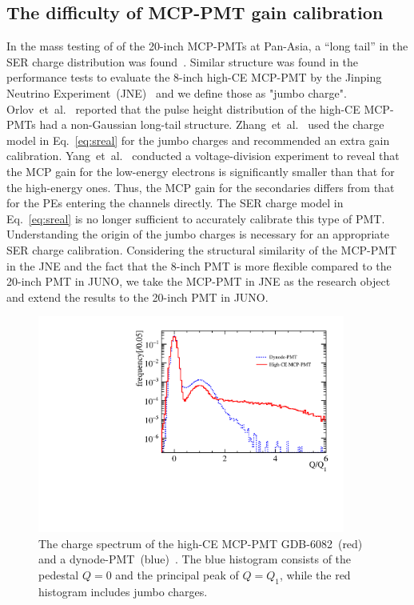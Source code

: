 \subsection{The difficulty of MCP-PMT gain calibration}
In the mass testing of of the 20-inch MCP-PMTs at Pan-Asia, a ``long tail'' in the SER charge distribution was found~\cite{JUNO:2022hlz}. Similar structure was found in the performance tests to evaluate the 8-inch high-CE MCP-PMT by the Jinping Neutrino Experiment~(JNE)~\cite{Zhang:2023ued} and we define those as "jumbo charge".
Orlov~et~al.~\cite{reviewer1} reported that the pulse height distribution of the high-CE MCP-PMTs had a non-Gaussian long-tail structure. Zhang~et~al.~\cite{2021Gain} used the charge model in Eq.~\eqref{eq:sreal} for the jumbo charges and recommended an extra gain calibration. Yang~et~al.~\cite{2017MCP} conducted a voltage-division experiment to reveal that the MCP gain for the low-energy electrons is significantly smaller than that for the high-energy ones.
Thus, the MCP gain for the secondaries differs from that for the PEs entering the channels directly.
The SER charge model in Eq.~\eqref{eq:sreal} is no longer sufficient to accurately calibrate this type of PMT.
Understanding the origin of the jumbo charges is necessary for an appropriate SER charge calibration.
Considering the structural similarity of the MCP-PMT in the JNE and the fact that the 8-inch PMT is more flexible compared to the 20-inch PMT in JUNO, we take the MCP-PMT in JNE as the research object and extend the results to the 20-inch PMT in JUNO.
\begin{figure}[h]
	\centering
	\includegraphics[width=0.9\textwidth]{PMTRelated/GTmodel/spe.pdf}
	\caption{The charge spectrum of the high-CE MCP-PMT GDB-6082~(red) and a dynode-PMT~(blue)~\cite{Zhang:2023ued}.
		The blue histogram consists of the pedestal $Q=0$ and the principal peak of $Q=Q_1$, while the red histogram includes jumbo charges.}
	\label{fig:spe_sreal}
\end{figure}

